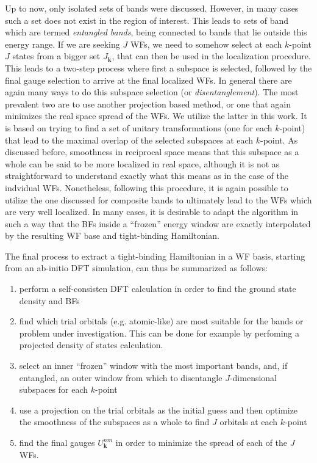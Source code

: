 Up to now, only isolated sets of bands were discussed. However, in many cases such a set does not exist in the region of interest.
This leads to sets of band which are termed {\it entangled bands}, being connected to bands that lie outside this energy range.
If we are seeking $J$ WFs, we need to somehow select at each $k$-point $J$ states from a bigger set $J_{\bm{k}}$, that can then be used in the localization procedure.
This leads to a two-step process where first a subspace is selected, followed by the final gauge selection to arrive at the final localized WFs.
In general there are again many ways to do this subspace selection (or {\it disentanglement}).
The most prevalent two are to use another projection based method, or one that again minimizes the real space spread of the WFs.
We utilize the latter in this work. It is based on trying to find a set of unitary transformations (one for each $k$-point) that lead to the maximal overlap of the selected subspaces at each $k$-point.
As discussed before, smoothness in reciprocal space means that this subspace as a whole can be said to be more localized in real space, although it is not as straightforward to understand exactly what this means as in the case of the indvidual WFs.
Nonetheless, following this procedure, it is again possible to utilize the one discussed for composite bands to ultimately lead to the WFs which are very well localized.
In many cases, it is desirable to adapt the algorithm in such a way that the BFs inside a ``frozen'' energy window are exactly interpolated by the resulting WF base and tight-binding Hamiltonian.

The final process to extract a tight-binding Hamiltonian in a WF basis, starting from an ab-initio DFT simulation, can thus be summarized as follows:
\begin{enumerate}
	\item perform a self-consisten DFT calculation in order to find the ground state density and BFs
	\item find which trial orbitals (e.g. atomic-like) are most suitable for the bands or problem under investigation. This can be done for example by perfoming a projected density of states calculation.
	\item select an inner ``frozen'' window with the most important bands, and, if entangled, an outer window from which to disentangle $J$-dimensional subspaces for each $k$-point
	\item use a projection on the trial orbitals as the initial guess and then optimize the smoothness of the subspaces as a whole to find $J$ orbitals at each $k$-point
	\item find the final gauges $U^{nm}_{\bm{k}}$ in order to minimize the spread of each of the $J$ WFs.
\end{enumerate}




